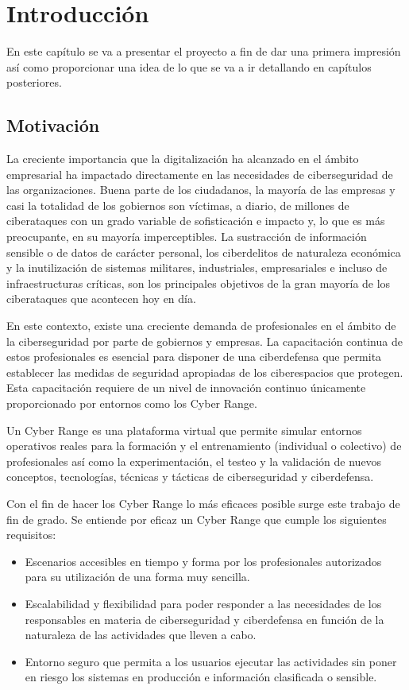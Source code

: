 \newpage
\setcounter{page}{1}
\chapter{Introducción} \label{ch:intro}  
  En este capítulo se va a presentar el proyecto a fin de dar una primera impresión así como proporcionar una idea de lo que se va a ir detallando en capítulos posteriores.

\section{Motivación} \label{sec:mot}
  La creciente importancia que la digitalización ha alcanzado en el ámbito empresarial ha impactado directamente en las necesidades de ciberseguridad de las organizaciones. Buena parte de los ciudadanos, la mayoría de las empresas y casi la totalidad de los gobiernos son víctimas, a diario, de millones de ciberataques con un grado variable de sofisticación e impacto y, lo que es más preocupante, en su mayoría imperceptibles. La sustracción de información sensible o de datos de carácter personal, los ciberdelitos de naturaleza económica y la inutilización de sistemas militares, industriales, empresariales e incluso de infraestructuras críticas, son los principales objetivos de la gran mayoría de los ciberataques que acontecen hoy en día.

  En este contexto, existe una creciente demanda de profesionales en el ámbito de la ciberseguridad por parte de gobiernos y empresas. La capacitación continua de estos profesionales es esencial para disponer de una ciberdefensa que permita establecer las medidas de seguridad apropiadas de los ciberespacios que protegen. Esta capacitación  requiere de un nivel de innovación continuo únicamente proporcionado por entornos como los Cyber Range.

  Un Cyber Range es una plataforma virtual que permite simular entornos operativos reales para la formación y el entrenamiento (individual o colectivo) de profesionales así como la experimentación,  el testeo y  la validación de nuevos conceptos, tecnologías, técnicas y tácticas de ciberseguridad y ciberdefensa.

  Con el fin de hacer los Cyber Range lo más eficaces posible surge este trabajo de fin de grado. Se entiende por eficaz un Cyber Range que cumple los siguientes requisitos:
  \begin{itemize}
    \item Escenarios accesibles en tiempo y forma por los profesionales autorizados para su utilización de una forma muy sencilla.
    \item Escalabilidad y flexibilidad para poder responder a las necesidades de los responsables en materia de ciberseguridad y ciberdefensa en función de la naturaleza de las actividades que lleven a cabo.
    \item Entorno seguro que permita a los usuarios ejecutar las actividades sin poner en riesgo los sistemas en producción e información clasificada o sensible.
  \end{itemize}

